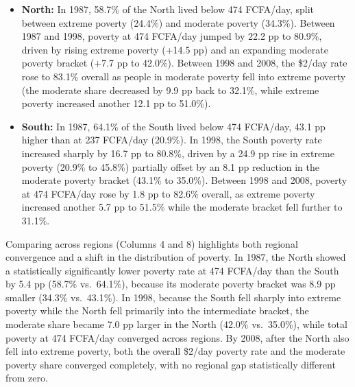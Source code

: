 \documentclass[
  letterpaper,
  DIV=11,
  numbers=noendperiod]{scrartcl}
\providecommand{\tightlist}{%
  \setlength{\itemsep}{0pt}\setlength{\parskip}{0pt}}
\begin{document}
\begin{itemize}
\tightlist
\item
  \textbf{North:} In 1987, 58.7\% of the North lived below 474 FCFA/day,
  split between extreme poverty (24.4\%) and moderate poverty (34.3\%).
  Between 1987 and 1998, poverty at 474 FCFA/day jumped by 22.2 pp to
  80.9\%, driven by rising extreme poverty (+14.5 pp) and an expanding
  moderate poverty bracket (+7.7 pp to 42.0\%). Between 1998 and 2008,
  the \$2/day rate rose to 83.1\% overall as people in moderate poverty
  fell into extreme poverty (the moderate share decreased by 9.9 pp back
  to 32.1\%, while extreme poverty increased another 12.1 pp to 51.0\%).
\item
  \textbf{South:} In 1987, 64.1\% of the South lived below 474 FCFA/day,
  43.1 pp higher than at 237 FCFA/day (20.9\%). In 1998, the South
  poverty rate increased sharply by 16.7 pp to 80.8\%, driven by a 24.9
  pp rise in extreme poverty (20.9\% to 45.8\%) partially offset by an
  8.1 pp reduction in the moderate poverty bracket (43.1\% to 35.0\%).
  Between 1998 and 2008, poverty at 474 FCFA/day rose by 1.8 pp to
  82.6\% overall, as extreme poverty increased another 5.7 pp to 51.5\%
  while the moderate bracket fell further to 31.1\%.
\end{itemize}

Comparing across regions (Columns 4 and 8) highlights both regional
convergence and a shift in the distribution of poverty. In 1987, the
North showed a statistically significantly lower poverty rate at 474
FCFA/day than the South by 5.4 pp (58.7\% vs.~64.1\%), because its
moderate poverty bracket was 8.9 pp smaller (34.3\% vs.~43.1\%). In
1998, because the South fell sharply into extreme poverty while the
North fell primarily into the intermediate bracket, the moderate share
became 7.0 pp larger in the North (42.0\% vs.~35.0\%), while total
poverty at 474 FCFA/day converged across regions. By 2008, after the
North also fell into extreme poverty, both the overall \$2/day poverty
rate and the moderate poverty share converged completely, with no
regional gap statistically different from zero.
\end{document}
